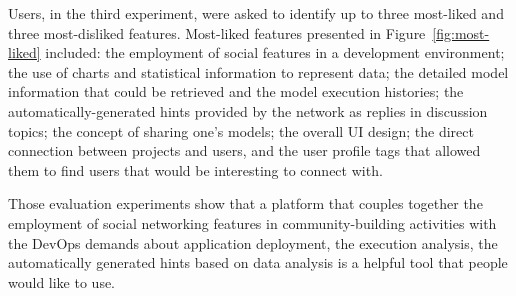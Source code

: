 Users, in the third experiment, were asked to identify up to three most-liked and three most-disliked features. Most-liked features presented in Figure~\ref{fig:most-liked} included: the employment of social features in a development environment; the use of charts and statistical information to represent data; the detailed model information that could be retrieved and the model execution histories; the automatically-generated hints provided by the network as replies in discussion topics; the concept of sharing one’s models; the overall UI design; the direct connection between projects and users, and the user profile tags that allowed them to find users that would be interesting to connect with.

Those evaluation experiments show that a platform that couples together the employment of social networking features in community-building activities with the DevOps demands about application deployment, the execution analysis, the automatically generated hints based on data analysis is a helpful tool that people would like to use.